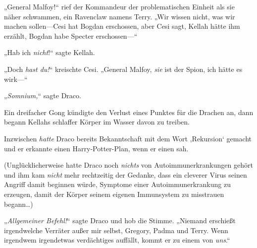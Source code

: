 „General Malfoy!“ rief der Kommandeur der problematischen Einheit als sie näher schwammen, ein Ravenclaw namens Terry. „Wir wissen nicht, was wir machen sollen—Cesi hat Bogdan erschossen, aber Cesi sagt, Kellah hätte ihm erzählt, Bogdan habe Specter erschossen—“

„Hab ich \emph{nicht}!“ sagte Kellah.

„Doch \emph{hast du!}“ kreischte Cesi. „General Malfoy, \emph{sie} ist der Spion, ich hätte es wirk—“

„\emph{Somnium,}“ sagte Draco.

Ein dreifacher Gong kündigte den Verlust eines Punktes für die Drachen an, dann begann Kellahs schlaffer Körper im Wasser davon zu treiben.

Inzwischen \emph{hatte} Draco bereits Bekanntschaft mit dem Wort ‚Rekursion‘ gemacht und er erkannte einen Harry-Potter-Plan, wenn er einen sah.

(Unglücklicherweise hatte Draco noch \emph{nichts} von Autoimmunerkrankungen gehört und ihm kam \emph{nicht} mehr rechtzeitig der Gedanke, dass ein cleverer Virus seinen Angriff damit beginnen würde, Symptome einer Autoimmunerkrankung zu erzeugen, damit der Körper seinem eigenen Immunsystem zu misstrauen begann…)

„\emph{Allgemeiner Befehl!}“ sagte Draco und hob die Stimme. „Niemand erschießt irgendwelche Verräter außer mir selbst, Gregory, Padma und Terry. Wenn irgendwem irgendetwas verdächtiges auffällt, kommt er zu einem von \emph{uns}.“

